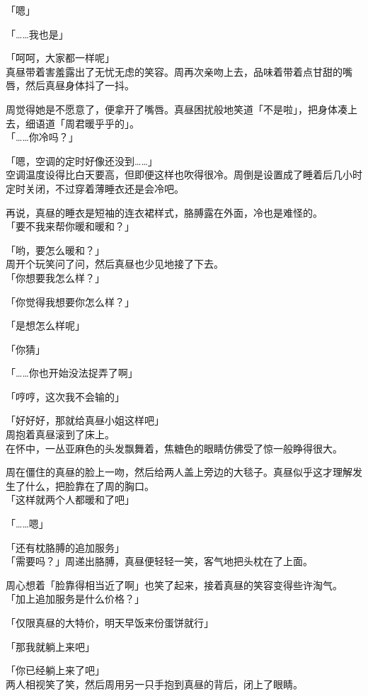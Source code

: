 「嗯」

「……我也是」

「呵呵，大家都一样呢」\\

真昼带着害羞露出了无忧无虑的笑容。周再次亲吻上去，品味着带着点甘甜的嘴唇，然后真昼身体抖了一抖。

周觉得她是不愿意了，便拿开了嘴唇。真昼困扰般地笑道「不是啦」，把身体凑上去，细语道「周君暖乎乎的」。\\

「……你冷吗？」

「嗯，空调的定时好像还没到……」\\

空调温度设得比白天要高，但即便这样也吹得很冷。周倒是设置成了睡着后几小时定时关闭，不过穿着薄睡衣还是会冷吧。

再说，真昼的睡衣是短袖的连衣裙样式，胳膊露在外面，冷也是难怪的。\\

「要不我来帮你暖和暖和？」

「哟，要怎么暖和？」\\

周开个玩笑问了问，然后真昼也少见地接了下去。\\

「你想要我怎么样？」

「你觉得我想要你怎么样？」

「是想怎么样呢」

「你猜」

「……你也开始没法捉弄了啊」

「哼哼，这次我不会输的」

「好好好，那就给真昼小姐这样吧」\\

周抱着真昼滚到了床上。\\

在怀中，一丛亚麻色的头发飘舞着，焦糖色的眼睛仿佛受了惊一般睁得很大。

周在僵住的真昼的脸上一吻，然后给两人盖上旁边的大毯子。真昼似乎这才理解发生了什么，把脸靠在了周的胸口。\\

「这样就两个人都暖和了吧」

「……嗯」

「还有枕胳膊的追加服务」\\

「需要吗？」周递出胳膊，真昼便轻轻一笑，客气地把头枕在了上面。

周心想着「脸靠得相当近了啊」也笑了起来，接着真昼的笑容变得些许淘气。\\

「加上追加服务是什么价格？」

「仅限真昼的大特价，明天早饭来份蛋饼就行」

「那我就躺上来吧」

「你已经躺上来了吧」\\

两人相视笑了笑，然后周用另一只手抱到真昼的背后，闭上了眼睛。

